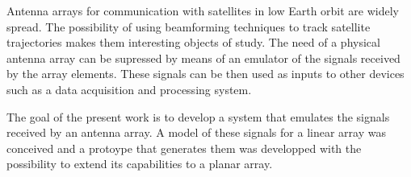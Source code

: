 \documentclass[class=article, crop=false]{standalone}
\begin{document}
Antenna arrays for communication with satellites in low Earth orbit are widely spread.
The possibility of using beamforming techniques to track satellite trajectories makes them interesting objects of study.
The need of a physical antenna array can be supressed by means of an emulator of the signals received by the array elements.
These signals can be then used as inputs to other devices such as a data acquisition and processing system.

The goal of the present work is to develop a system that emulates the signals received by an antenna array.
A model of these signals for a linear array was conceived and a protoype that generates them was developped with the possibility to extend its capabilities to a planar array.

%
\end{document}
